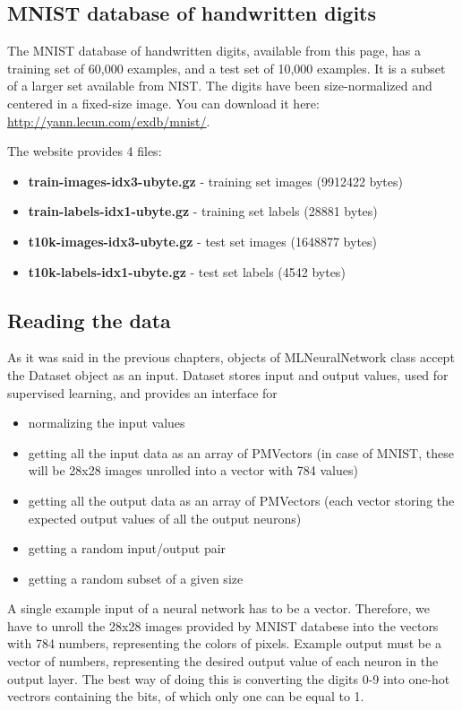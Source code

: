 \subsection{MNIST database of handwritten digits}
The MNIST database of handwritten digits, available from this page, has a training set of 60,000 examples, and a test set of 10,000 examples. It is a subset of a larger set available from NIST. The digits have been size-normalized and centered in a fixed-size image. You can download it here: \url{http://yann.lecun.com/exdb/mnist/}.

The website provides 4 files:
\begin{itemize}
  \item \textbf{train-images-idx3-ubyte.gz} - training set images (9912422 bytes)
  \item \textbf{train-labels-idx1-ubyte.gz} - training set labels (28881 bytes)
  \item \textbf{t10k-images-idx3-ubyte.gz} - test set images (1648877 bytes)
  \item \textbf{t10k-labels-idx1-ubyte.gz} - test set labels (4542 bytes) 
\end{itemize}

\subsection{Reading the data}
As it was said in the previous chapters, objects of MLNeuralNetwork class accept the Dataset object as an input. Dataset stores input and output values, used for supervised learning, and provides an interface for
\begin{itemize}
  \item normalizing the input values
  \item getting all the input data as an array of PMVectors (in case of MNIST, these will be 28x28 images unrolled into a vector with 784 values)
  \item getting all the output data as an array of PMVectors (each vector storing the expected output values of all the output neurons)
  \item getting a random input/output pair
  \item getting a random subset of a given size
\end{itemize}

A single example input of a neural network has to be a vector. Therefore, we have to unroll the 28x28 images provided by MNIST databese into the vectors with 784 numbers, representing the colors of pixels. Example output must be a vector of numbers, representing the desired output value of each neuron in the output layer. The best way of doing this is converting the digits 0-9 into one-hot vectrors containing the bits, of which only one can be equal to 1.


